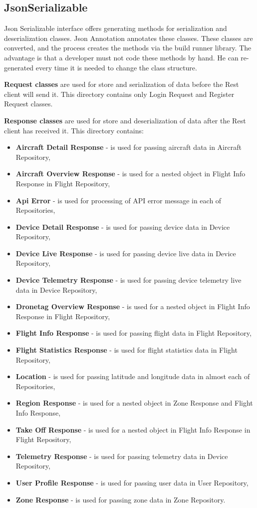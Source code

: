 \subsection{JsonSerializable}\label{subsec:jsonserializable-classes}
Json Serializable interface offers generating methods for serialization and deserialization classes.
Json Annotation annotates these classes.
These classes are converted, and the process creates the methods via the build runner library.
The advantage is that a developer must not code these methods by hand.
He can re-generated every time it is needed to change the class structure.

\textbf{Request classes} are used for store and serialization of data before the Rest client will send it.
This directory contains only Login Request and Register Request classes.

\textbf{Response classes} are used for store and deserialization of data after the Rest client has received it.
This directory contains:
\begin{itemize}
    \item \textbf{Aircraft Detail Response} - is used for passing aircraft data in Aircraft Repository,
    \item \textbf{Aircraft Overview Response} - is used for a nested object in Flight Info Response in Flight Repository,
    \item \textbf{Api Error} - is used for processing of API error message in each of Repositories,
    \item \textbf{Device Detail Response} - is used for passing device data in Device Repository,
    \item \textbf{Device Live Response} - is used for passing device live data in Device Repository,
    \item \textbf{Device Telemetry Response} - is used for passing device telemetry live data in Device Repository,
    \item \textbf{Dronetag Overview Response} - is used for a nested object in Flight Info Response in Flight Repository,
    \item \textbf{Flight Info Response} - is used for passing flight data in Flight Repository,
    \item \textbf{Flight Statistics Response} - is used for flight statistics data in Flight Repository,
    \item \textbf{Location} - is used for passing latitude and longitude data in almost each of Repositories,
    \item \textbf{Region Response} - is used for a nested object in Zone Response and Flight Info Response,
    \item \textbf{Take Off Response} - is used for a nested object in Flight Info Response in Flight Repository,
    \item \textbf{Telemetry Response} - is used for passing telemetry data in Device Repository,
    \item \textbf{User Profile Response} - is used for passing user data in User Repository,
    \item \textbf{Zone Response} - is used for passing zone data in Zone Repository.
\end{itemize}
